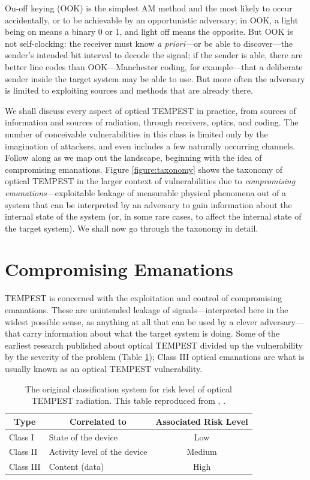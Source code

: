 \documentclass[a4paper,twoside,11pt,openany]{book}
\begin{document}
On-off keying (OOK) is the simplest AM method and the most likely to occur
accidentally, or to be achievable by an opportunistic adversary; in OOK, a
light being on means a binary 0 or 1, and light
off means the opposite. But OOK is not self-clocking: the receiver must
know {\it a priori}---or be able to discover---the sender's intended bit
interval to decode the signal; if the sender is able, there are better line
codes than OOK---Manchester coding, for example---that a deliberate sender
inside the target system may be able to use. But more often the adversary is
limited to exploiting sources and methods that are already there.

We shall discuss every aspect of optical TEMPEST in practice, from sources of
information and sources of radiation, through receivers, optics, and coding.
The number of conceivable vulnerabilities in this class is limited only by the
imagination of attackers, and even includes a few naturally occurring channels.
Follow along as we map out the landscape, beginning with the idea of
compromising emanations.
Figure \ref{figure:taxonomy} shows the taxonomy of optical TEMPEST in the
larger context of vulnerabilities due to \emph{compromising
emanations}---exploitable leakage of measurable physical phenomena out of a
system that can be interpreted by an adversary to gain information about the
internal state of the system (or, in some rare cases, to affect the internal
state of the target system). We shall now go through the taxonomy in detail.
\section{Compromising Emanations}
TEMPEST is concerned with the exploitation and control of compromising
emanations. These are unintended leakage of signals---interpreted here in the
widest possible sense, as anything at all that can be used by a clever
adversary---that carry information about what the target system is doing. Some
of the earliest research published about optical TEMPEST divided up the
vulnerability by the severity of the problem (Table \ref{table:class_III});
Class III optical emanations are what is usually known as an optical TEMPEST
vulnerability.

\begin{table}[ht]
\caption{The original classification system for risk level of optical TEMPEST
radiation. This table reproduced from \citeauthor{Loughry2002a},
\citeyear{Loughry2002a}.}
\medskip
\label{table:class_III}
\centering
\begin{tabular}{|l|l|c|}
\hline
\multicolumn{1}{|c|}{Type} & \multicolumn{1}{|c|}{Correlated to}
  & Associated Risk Level \bigstrut \\
\hline
\renewcommand{\arraystretch}{1}
Class I & State of the device & Low \\
Class II & Activity level of the device & Medium \\
Class III & Content (data) & High \\
\hline
\end{tabular}
\end{table}
\end{document}
